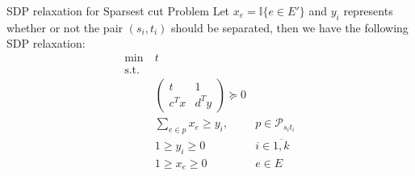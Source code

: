 \documentclass[10pt]{beamer}
\begin{document}
	
	\begin{frame}{SDP relaxation for Sparsest cut Problem}
	    Let $x_e = \mathbb{I}\{e \in E'\}$ and $y_i$ represents whether or not the pair $(s_i, t_i)$ should be separated, then we have the following SDP relaxation:
	    \begin{align*}
	        \min &~t &\\
	        \text{s.t.}& &\\ 
	        &~ \begin{pmatrix} t & 1 \\ c^Tx & d^Ty \end{pmatrix} \succeq 0 &\\
	        &~ \sum_{e \in p} x_e \geq y_i,  &p \in \mathcal{P}_{s_i t_i} \\
	        &~ 1 \geq y_i \geq 0  &i \in \overline{1, k} \\
	        &~ 1\geq x_e \geq 0 & e \in E
	    \end{align*}
	\end{frame}
\end{document}
